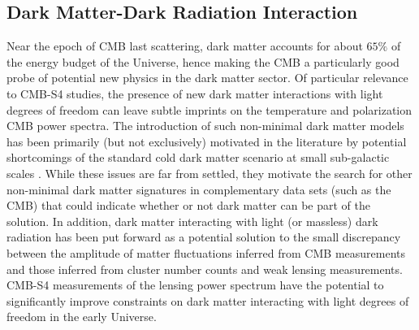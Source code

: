 \subsection{Dark Matter-Dark Radiation Interaction}
%
Near the epoch of CMB last scattering, dark matter accounts for about $65\%$ of the energy budget of the Universe, hence making the CMB a particularly good probe of potential new physics in the dark matter sector. Of particular relevance to CMB-S4 studies, the presence of new dark matter interactions with light degrees of freedom \cite{Goldberg:1986nk,1992ApJ...398...43C,1992ApJ...398..407G,1994ApJ...431...41M,1995ApJ...452..495D,AtrioBarandela:1996ur,Boehm:2001hm,Foot:2004pa,Green:2005fa,Profumo:2006bv,Mangano:2006mp,Ackerman:2008gi,ArkaniHamed:2008qn,Feng:2009mn,Serra:2009uu,Bringmann:2009vf,Kaplan:2009de,McDermott:2010pa,Kaplan:2011yj,Aarssen:2012fx,Diamanti:2012tg,Baldi:2012ua,Cline:2012is,Cyr-Racine:2013ab,Fan:2013yva,Fan:2013tia,Cyr-Racine:2013fsa,Bringmann:2013vra,Wilkinson:2013kia,Dvorkin:2013cea,Boehm:2014vja,Wilkinson:2014ksa,Escudero:2015yka,Chu:2014lja,Archidiacono:2014nda,Buen-Abad:2015ova,Lesgourgues:2015wza} can leave subtle imprints on the temperature and polarization CMB power spectra. The introduction of such non-minimal dark matter models has been primarily (but not exclusively) motivated in the literature by potential shortcomings of the standard cold dark matter scenario at small sub-galactic scales \cite{deBlok:1997zlw,Klypin:1999uc,Moore:1999aa,Zavala:2009ms,Oh:2010ea,BoylanKolchin:2011de,Papastergis:2011xe,Walker:2011zu,Pawlowski01112013,Klypin:2014ira,Oman:2015xda,Papastergis2015de}. While these issues are far from settled, they motivate the search for other non-minimal dark matter signatures in complementary data sets (such as the CMB) that could indicate whether or not dark matter can be part of the solution. In addition, dark matter interacting with light (or massless) dark radiation  has been put forward \cite{Buen-Abad:2015ova,Lesgourgues:2015wza} as a potential solution to the small discrepancy between the amplitude of matter fluctuations inferred from CMB measurements and those inferred from cluster number counts and weak lensing measurements. CMB-S4 measurements of the lensing power spectrum have the potential to significantly improve constraints on dark matter interacting with light degrees of freedom in the early Universe.

